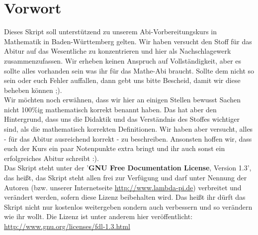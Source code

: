 \chapter*{Vorwort}
Dieses Skript soll unterstützend zu unserem Abi-Vorbereitungskurs in Mathematik in Baden-Württemberg gelten. Wir haben versucht den Stoff für das Abitur auf das Wesentliche zu konzentrieren und hier als Nachschlagewerk zusammenzufassen.
Wir erheben keinen Anspruch auf Vollständigkeit, aber es sollte alles vorhanden sein was ihr für das Mathe-Abi braucht. Sollte dem nicht so sein oder euch Fehler auffallen, dann gebt uns bitte Bescheid, damit wir diese beheben können ;).\\
Wir möchten noch erwähnen, dass wir hier an einigen Stellen bewusst Sachen nicht 100\%ig mathematisch korrekt benannt haben. Das hat aber den Hintergrund, dass uns die Didaktik und das Verständnis des Stoffes wichtiger sind, als die mathematisch korrekten Definitionen. Wir haben aber versucht, alles - für das Abitur ausreichend korrekt - zu beschreiben. Ansonsten hoffen wir, dass euch der Kurs ein paar Notenpunkte extra bringt und ihr auch sonst ein erfolgreiches Abitur schreibt :).\\
Das Skript steht unter der '\textbf{GNU Free Documentation License}, Version 1.3', das heißt, das Skript steht allen frei zur Verfügung und darf unter Nennung der Autoren (bzw. unserer Internetseite \url{http://www.lambda-pi.de}) verbreitet und verändert werden, sofern diese Lizenz beibehalten wird. Das heißt ihr dürft das Skript nicht nur kostenlos weitergeben sondern auch verbessern und so verändern wie ihr wollt. Die Lizenz ist unter anderem hier veröffentlicht:\\
\url{http://www.gnu.org/licenses/fdl-1.3.html}